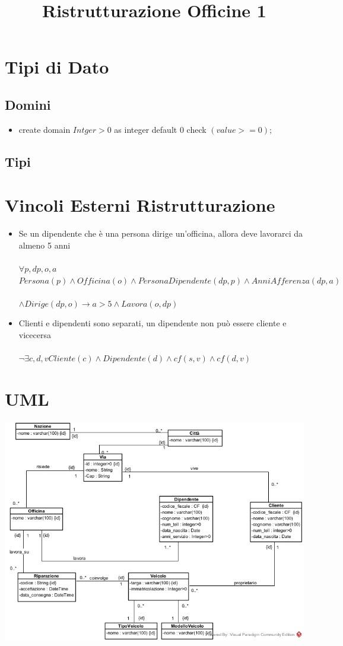 \documentclass[12pt, letterpaper]{article}
\title{Ristrutturazione Officine 1 }
\date{}
\newcommand{\acc}{\\\hphantom{}\\}
\begin{document}
\maketitle

\section{Tipi di Dato}
\subsection{Domini}
\begin{itemize}
    \item create domain $Intger>0$ as integer
    default 0
    check $(value>=0);$
\end{itemize}
\subsection{Tipi}

\section{Vincoli Esterni Ristrutturazione}
\begin{itemize}
    \item Se un dipendente che è una persona dirige un'officina, allora deve lavorarci da almeno 5 anni \acc
    $\forall p,dp,o,a$ $Persona(p) \land Officina(o) \land PersonaDipendente(dp,p)\land AnniAfferenza(dp,a)$ \acc $\land Dirige(dp,o) \rightarrow a>5 \land Lavora(o,dp)$
    \item Clienti e dipendenti sono separati, un dipendente non può essere cliente e vicecersa \acc
    $\lnot \exists c, d, v Cliente(c) \land Dipendente(d) \land cf(s, v) \land cf(d, v)$
\end{itemize} \newpage
\section{UML}
\begin{center}
    \includegraphics[width=\textwidth]{UML.jpg}
\end{center}
\end{document}

